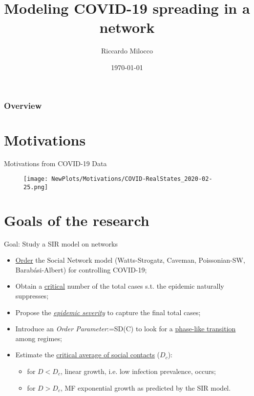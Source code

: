 \documentclass[xcolor={dvipsnames}]{beamer}
\title[Network Covid-19]{Modeling COVID-19 spreading in a network} %
\author{Riccardo Milocco} %
\institute[UniPD] %
{
University of Padova \\ %
\medskip
\textit{} %
}
\date{\today} %
\begin{document}
\begin{frame}
\titlepage %
\end{frame}

\begin{frame}
\frametitle{Overview} %
\tableofcontents %
\end{frame}

\section{Motivations}
\begin{frame}{Motivations from COVID-19 Data}
	\begin{figure}[h]
		\centering
		\texttt{[image: NewPlots/Motivations/COVID-RealStates\_2020-02-25.png]}
	\end{figure}
\end{frame}

\section{Goals of the research}
\begin{frame}{Goal: Study a SIR model on networks}
\centering
\begin{itemize}
	\item \underline{Order} the Social Network model (Watts-Strogatz, Caveman, Poissonian-SW, Barabási-Albert) for controlling COVID-19; \vfill
	\item Obtain a \underline{critical} number of the total cases s.t. the epidemic naturally suppresses; \vfill
	\item Propose the \underline{\textit{epidemic severity}} to capture the final total cases; \vfill
	\item Introduce an \textit{Order Parameter}:=SD(C) to look for a \underline{phase-like transition} among regimes; \vfill
	\item Estimate the \underline{critical average of social contacts} ($D_c$):
	\begin{itemize}
		\item for $D<D_c$, linear growth, i.e. low infection prevalence, occurs;
		\vspace{2mm }
		\item for $D>D_c$, MF exponential growth as predicted by the SIR model.
	\end{itemize}
\end{itemize}
\end{frame}
\end{document}
